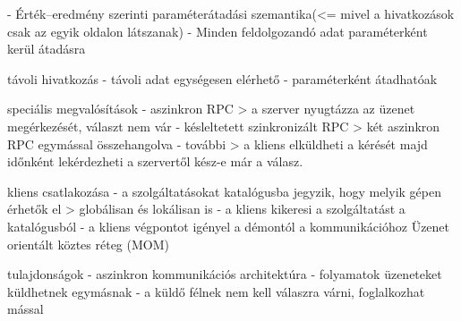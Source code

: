 \documentclass[twoside, a4paper, 12pt]{article}
\begin{document}
\begin{description}
                                                                        - Érték–eredmény szerinti paraméterátadási szemantika(<=  mivel a hivatkozások csak az egyik oldalon látszanak)
                                                                        - Minden feldolgozandó adat paraméterként kerül átadásra
                                                                    \item távoli hivatkozás
                                                                        - távoli adat egységesen elérhető
                                                                        - paraméterként átadhatóak
                                                                    \item speciális megvalósítások
                                                                        - aszinkron RPC
                                                                        > a szerver nyugtázza az üzenet megérkezését, választ nem vár
                                                                        - késleltetett szinkronizált RPC
                                                                        > két aszinkron RPC egymással összehangolva
                                                                        - további
                                                                        > a kliens elküldheti a kérését majd időnként lekérdezheti a szervertől kész-e már a válasz.
                                                                    \item kliens csatlakozása
                                                                        - a szolgáltatásokat katalógusba jegyzik, hogy melyik gépen érhetők el
                                                                        > globálisan és lokálisan is
                                                                        - a kliens kikeresi a szolgáltatást a katalógusból
                                                                        - a kliens végpontot igényel a démontól a kommunikációhoz
                                                                        Üzenet orientált köztes réteg (MOM)
                                                                    \item tulajdonságok
                                                                        - aszinkron kommunikációs architektúra
                                                                        - folyamatok üzeneteket küldhetnek egymásnak
                                                                        - a küldő félnek nem kell válaszra várni, foglalkozhat mással

\end{description}
\end{document}
